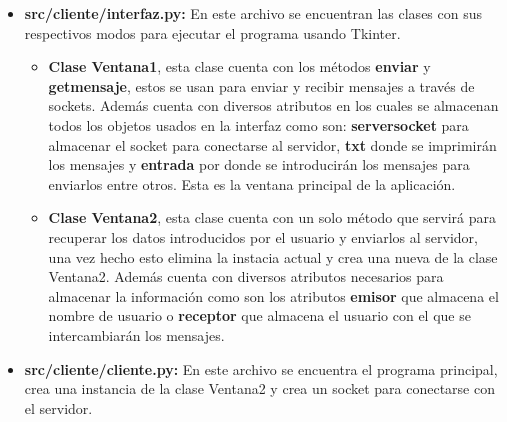 \begin{itemize}
\begin{itemize}
		\end{itemize}
	\item \textbf{src/cliente/interfaz.py:} En este archivo se encuentran las clases con sus respectivos modos para ejecutar el programa usando Tkinter.
		\begin{itemize}
			\item \textbf{Clase Ventana1}, esta clase cuenta con los métodos \textbf{enviar} y \textbf{get\textunderscore mensaje}, estos se usan para enviar y recibir mensajes a través de sockets. Además cuenta con diversos atributos en los cuales se almacenan todos los objetos usados en la interfaz como son: \textbf{server\textunderscore socket} para almacenar el socket para conectarse al servidor, \textbf{txt} donde se imprimirán los mensajes y \textbf{entrada} por donde se introducirán los mensajes para enviarlos entre otros. Esta es la ventana principal de la aplicación.
			\item \textbf{Clase Ventana2}, esta  clase cuenta con un solo método que servirá para recuperar los datos introducidos por el usuario y enviarlos al servidor, una vez hecho esto elimina la instacia actual y crea una nueva de la clase Ventana2.
					Además cuenta con diversos atributos necesarios para almacenar la información como son los atributos \textbf{emisor} que almacena el nombre de usuario o \textbf{receptor} que almacena el usuario con el que se intercambiarán los mensajes.
		\end{itemize}
	\item \textbf{src/cliente/cliente.py:} En este archivo se encuentra el programa principal, crea una instancia de la clase Ventana2 y crea un socket para conectarse con el servidor.
\end{itemize}

